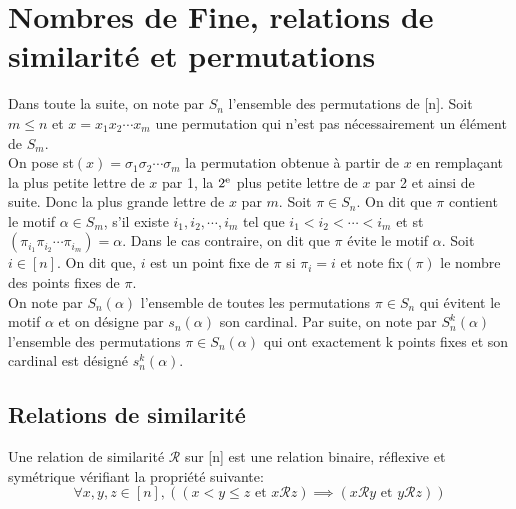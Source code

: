 \chapter{Nombres de Fine, relations de similarité et permutations}
Dans toute la suite, on note par $S_{n}$ l'ensemble des permutations de [n]. Soit $m\leq n$ et $x = x_{1}x_{2}\cdots x_{m} $ une permutation qui n'est pas nécessairement un élément de $ S_{m} $.\\ On pose st$(x) = \sigma_{1}\sigma_{2}\cdots \sigma_{m}$ la permutation obtenue à partir de $x$ en remplaçant
la plus petite lettre de $x$ par 1, la $2\textsuperscript{e}$ plus petite lettre de $x$ par 2 et ainsi
de suite. Donc la plus grande lettre de $x$ par $m$. Soit $\pi \in S_{n}$. On dit que $\pi $ contient le
motif $\alpha \in S_{m}$, s'il existe $i_{1},i_{2}, \cdots, i_{m}$ tel que $i_{1}<i_{2}< \cdots
	<i_{m}$ et st$(\pi_{i_{1}}\pi_{i_{2}}\cdots \pi_{i_{m}})=\alpha$. Dans le cas contraire, on dit que $\pi$ évite le motif $\alpha$.
Soit $i\in [n]$. On dit que, $i$ est un point fixe de $\pi$ si $\pi_{i}=i$ et note fix$(\pi)$ le nombre des points fixes de $\pi$.\\ On note par  $S_{n}(\alpha)$ l'ensemble
de toutes les permutations $\pi \in S_{n}$ qui évitent le motif $\alpha$ et on désigne par $s_{n}(\alpha)$ son cardinal. Par suite, on note par $S_{n}^k(\alpha)$ l'ensemble des permutations $\pi \in S_{n}(\alpha)$ qui ont exactement k points fixes et son cardinal est désigné $s_{n}^{k}(\alpha)$.
\vspace{5pt}


\section{Relations de similarité }
\begin{definition}
	\begin{rm}
		Une relation de similarité $\mathcal{R}$ sur [n] est une relation binaire, réflexive et symétrique
		vérifiant la propriété suivante:
		$$\forall x, y, z \in [n], \left((x<y\leq z \text{ et } x\mathcal{R}z) \implies
			(x\mathcal{R}y \text{ et } y\mathcal{R}z)\right) $$
	\end{rm}
\end{definition}

